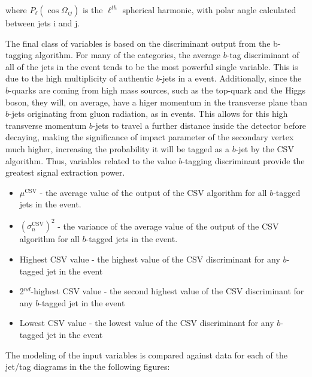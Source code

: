 \noindent where $P_{\ell}(\cos{\Omega_{ij}})$ is the $\ell^{th}$
spherical harmonic, with polar angle calculated between jets i and j.  

\par The final class of variables is based on the discriminant output
from the b-tagging algorithm.  For many of the categories, the average
$b$-tag discriminant of all of the jets in the event tends to be the
most powerful single variable.  This is due to the high multiplicity
of authentic $b$-jets in a \ttH event.  Additionally, since the
$b$-quarks are coming from high mass sources, such as the top-quark
and the Higgs boson, they will, on average, have a higer momentum in
the transverse plane than $b$-jets originating from gluon radiation,
as in \ttbb events. This allows for this high transverse momentum
$b$-jets to travel a further distance inside the detector before
decaying, making the significance of impact parameter of the secondary
vertex much higher, increasing the probability it will be tagged as a
$b$-jet by the CSV algorithm.  Thus, variables related to the value
$b$-tagging discriminant provide the greatest signal extraction
power.  

\begin{itemize}
  \item $\mu^{\text{CSV}}$ - the average value of the output of the
    CSV algorithm for all $b$-tagged jets in the event.  
  \item $(\sigma_n^{\text{CSV}})^2$ - the variance of the average value of the output of the
    CSV algorithm for all $b$-tagged jets in the event. 
  \item Highest CSV value - the highest value of the CSV discriminant
    for any $b$-tagged jet in the event 
  \item 2$^{nd}$-highest CSV value - the second highest value of the CSV discriminant
    for any $b$-tagged jet in the event 
  \item Lowest CSV value - the lowest value of the CSV discriminant
    for any $b$-tagged jet in the event 
\end{itemize}

\par The modeling of the input variables is compared against data for
each of the jet/tag diagrams in the the following figures: 

